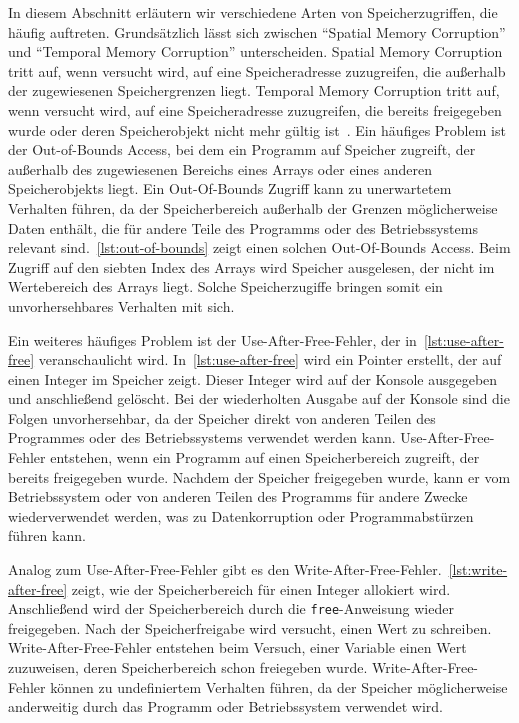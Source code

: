 \documentclass[acmtog,nonacm]{acmart}
\begin{document}
In diesem Abschnitt erläutern wir verschiedene Arten von Speicherzugriffen, die 
häufig auftreten. Grundsätzlich lässt sich zwischen "`Spatial Memory Corruption"' und "`Temporal
Memory Corruption"' unterscheiden. Spatial Memory Corruption tritt auf, wenn
versucht wird, auf eine Speicheradresse zuzugreifen, die außerhalb der
zugewiesenen Speichergrenzen liegt. Temporal Memory Corruption tritt auf, wenn
versucht wird, auf eine Speicheradresse zuzugreifen, die bereits freigegeben
wurde oder deren Speicherobjekt nicht mehr gültig ist~\cite{mcds_2023}. Ein
häufiges Problem ist der Out-of-Bounds Access, bei dem ein Programm auf
Speicher zugreift, der außerhalb des zugewiesenen Bereichs eines Arrays oder
eines anderen Speicherobjekts liegt. Ein Out-Of-Bounds Zugriff kann zu unerwartetem Verhalten
führen, da der Speicherbereich außerhalb der Grenzen möglicherweise Daten
enthält, die für andere Teile des Programms oder des Betriebssystems relevant
sind.~\cref{lst:out-of-bounds} zeigt einen solchen Out-Of-Bounds Access. Beim
Zugriff auf den siebten Index des Arrays wird Speicher ausgelesen, der nicht im
Wertebereich des Arrays liegt. Solche Speicherzugiffe bringen somit ein unvorhersehbares Verhalten mit sich.



Ein weiteres häufiges Problem ist der Use-After-Free-Fehler, der
in~\cref{lst:use-after-free} veranschaulicht wird. In~\cref{lst:use-after-free} wird ein Pointer erstellt, der auf einen
Integer im Speicher zeigt. Dieser Integer wird auf der Konsole ausgegeben und
anschließend gelöscht. Bei der wiederholten Ausgabe auf der Konsole sind die
Folgen unvorhersehbar, da der Speicher direkt von anderen Teilen des Programmes
oder des Betriebssystems verwendet werden kann. Use-After-Free-Fehler entstehen, wenn ein Programm auf einen Speicherbereich zugreift, der bereits
freigegeben wurde. Nachdem der Speicher freigegeben wurde, kann er vom
Betriebssystem oder von anderen Teilen des Programms für andere Zwecke
wiederverwendet werden, was zu Datenkorruption oder Programmabstürzen führen
kann. 



Analog zum Use-After-Free-Fehler gibt es den Write-After-Free-Fehler.~\cref{lst:write-after-free} zeigt, wie der
Speicherbereich für einen Integer allokiert wird. Anschließend wird der
Speicherbereich durch die \verb|free|-Anweisung wieder freigegeben. Nach der
Speicherfreigabe wird versucht, einen Wert zu schreiben. Write-After-Free-Fehler entstehen beim Versuch, einer Variable einen Wert zuzuweisen, deren Speicherbereich
schon freiegeben wurde.
Write-After-Free-Fehler können zu undefiniertem Verhalten führen, da der Speicher
möglicherweise anderweitig durch das Programm oder Betriebssystem verwendet
wird.
\end{document}
